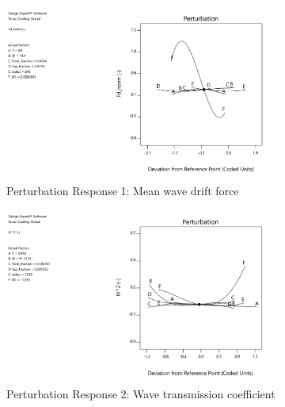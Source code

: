 \begin{figure}[h]
    \centering
    \begin{subfigure}[b]{0.49\textwidth}
        \centering
        \includegraphics[width=\linewidth]{figures/ComFLOW/Results DI1/perturbation R1.pdf}
        \caption[]%
        {{\small Perturbation Response 1: Mean wave drift force}}    
        \label{fig: perturbation R1 DI1 captive}
    \end{subfigure}
    \hfill
    \begin{subfigure}[b]{0.49\textwidth}  
        \centering 
        \includegraphics[width=\linewidth]{figures/ComFLOW/Results DI1/perturbation R2.pdf}
        \caption[]%
        {{\small Perturbation Response 2: Wave transmission coefficient}}    
        \label{fig: perturbation R2 DI1 captive}
    \end{subfigure}


    \caption{}
    \label{fig: }
\end{figure}





